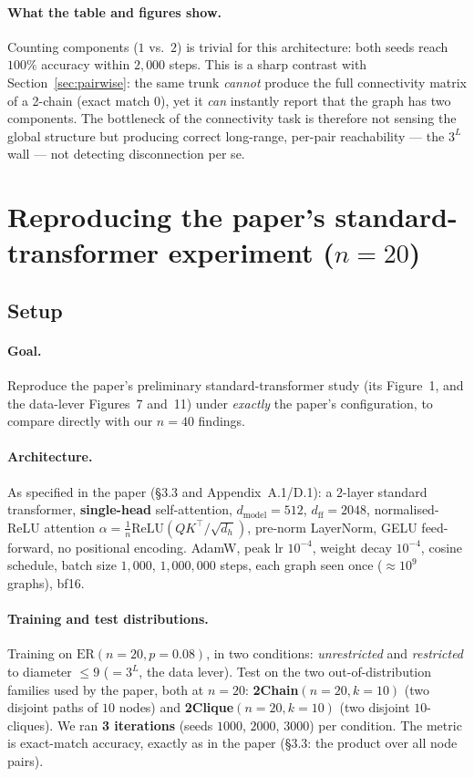 \documentclass[11pt,a4paper]{article}
\begin{document}
\paragraph{What the table and figures show.} Counting components ($1$ vs.\ $2$)
is trivial for this architecture: both seeds reach $100\%$ accuracy within
$2{,}000$ steps. This is a sharp contrast with Section~\ref{sec:pairwise}: the
same trunk \emph{cannot} produce the full connectivity matrix of a 2-chain
(exact match $0$), yet it \emph{can} instantly report that the graph has two
components. The bottleneck of the connectivity task is therefore not sensing the
global structure but producing correct long-range, per-pair reachability ---
the $3^L$ wall --- not detecting disconnection per se.

\section{Reproducing the paper's standard-transformer experiment ($n = 20$)}
\label{sec:repro}

\subsection{Setup}

\paragraph{Goal.} Reproduce the paper's preliminary standard-transformer study
(its Figure~1, and the data-lever Figures~7 and~11) under \emph{exactly} the
paper's configuration, to compare directly with our $n = 40$ findings.

\paragraph{Architecture.} As specified in the paper (\S3.3 and Appendix~A.1/D.1):
a $2$-layer standard transformer, \textbf{single-head} self-attention,
$d_{\mathrm{model}} = 512$, $d_{\mathrm{ff}} = 2048$, normalised-ReLU attention
$\alpha = \tfrac{1}{n}\mathrm{ReLU}(QK^\top/\sqrt{d_h})$, pre-norm LayerNorm,
GELU feed-forward, no positional encoding. AdamW, peak lr $10^{-4}$, weight
decay $10^{-4}$, cosine schedule, batch size $1{,}000$, $1{,}000{,}000$ steps,
each graph seen once ($\approx 10^9$ graphs), bf16.

\paragraph{Training and test distributions.} Training on
\textbf{$\mathrm{ER}(n = 20, p = 0.08)$}, in two conditions: \emph{unrestricted}
and \emph{restricted} to diameter $\le 9$ ($= 3^L$, the data lever). Test on the
two out-of-distribution families used by the paper, both at $n = 20$:
\textbf{2Chain$(n = 20, k = 10)$} (two disjoint paths of $10$ nodes) and
\textbf{2Clique$(n = 20, k = 10)$} (two disjoint $10$-cliques). We ran
\textbf{3 iterations} (seeds $1000$, $2000$, $3000$) per condition. The metric
is exact-match accuracy, exactly as in the paper (\S3.3: the product over all
node pairs).
\end{document}
